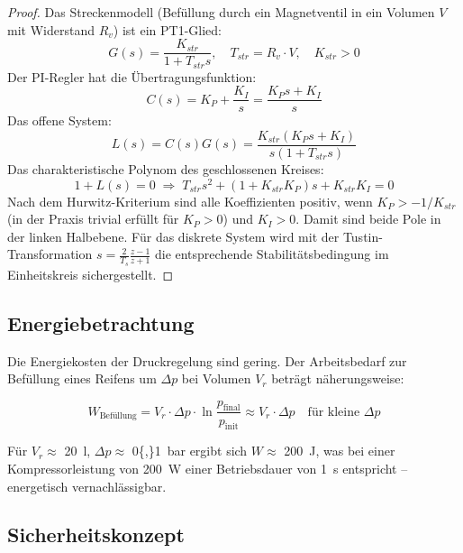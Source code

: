 ﻿\documentclass[12pt,a4paper]{article}
\theoremstyle{definition}
\theoremstyle{remark}
\begin{document}
\begin{proof}
Das Streckenmodell (Befüllung durch ein Magnetventil in ein
Volumen $V$ mit Widerstand $R_v$) ist ein PT1-Glied:
\begin{equation}
  G(s) = \frac{K_{str}}{1 + T_{str} s}, \quad
  T_{str} = R_v \cdot V, \quad K_{str} > 0
\end{equation}
Der PI-Regler hat die Übertragungsfunktion:
\begin{equation}
  C(s) = K_P + \frac{K_I}{s} = \frac{K_P s + K_I}{s}
\end{equation}
Das offene System:
\begin{equation}
  L(s) = C(s) G(s) = \frac{K_{str}(K_P s + K_I)}{s(1 + T_{str} s)}
\end{equation}
Das charakteristische Polynom des geschlossenen Kreises:
\begin{equation}
  1 + L(s) = 0 \;\Rightarrow\; T_{str} s^2 + (1 + K_{str} K_P) s + K_{str} K_I = 0
\end{equation}
Nach dem Hurwitz-Kriterium sind alle Koeffizienten positiv, wenn
$K_P > -1/K_{str}$ (in der Praxis trivial erfüllt für $K_P > 0$) und $K_I > 0$.
Damit sind beide Pole in der linken Halbebene. Für das diskrete System wird
mit der Tustin-Transformation $s = \frac{2}{T_s}\frac{z-1}{z+1}$ die entsprechende
Stabilitätsbedingung im Einheitskreis sichergestellt.
\end{proof}

\subsection{Energiebetrachtung}

Die Energiekosten der Druckregelung sind gering. Der Arbeitsbedarf zur
Befüllung eines Reifens um $\Delta p$ bei Volumen $V_r$ beträgt näherungsweise:

\begin{equation}
  W_{\text{Befüllung}} = V_r \cdot \Delta p \cdot \ln\!\frac{p_{\mathrm{final}}}{p_{\mathrm{init}}}
  \approx V_r \cdot \Delta p
  \quad\text{für kleine $\Delta p$}
\end{equation}

Für $V_r \approx$ \SI{20}{\litre}, $\Delta p \approx$ \SI{0{,}1}{\bar} ergibt sich
$W \approx$ \SI{200}{\joule}, was bei einer Kompressorleistung von \SI{200}{\watt}
einer Betriebsdauer von \SI{1}{\second} entspricht -- energetisch vernachlässigbar.

\subsection{Sicherheitskonzept}
\end{document}
